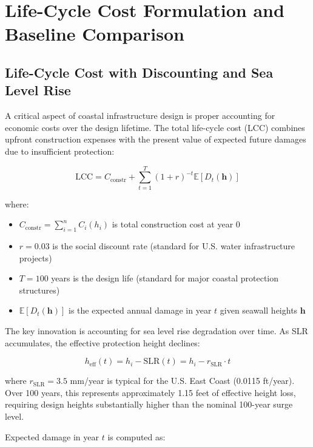 \documentclass[review]{elsarticle}
\begin{document}
\section{Life-Cycle Cost Formulation and Baseline Comparison}

\subsection{Life-Cycle Cost with Discounting and Sea Level Rise}

A critical aspect of coastal infrastructure design is proper accounting for economic costs over the design lifetime. The total life-cycle cost (LCC) combines upfront construction expenses with the present value of expected future damages due to insufficient protection:

\begin{equation}
\text{LCC} = C_{\text{constr}} + \sum_{t=1}^{T} \left(1 + r\right)^{-t} \mathbb{E}[D_t(\mathbf{h})]
\label{eq:lifecycle_cost}
\end{equation}

where:
\begin{itemize}
\item $C_{\text{constr}} = \sum_{i=1}^{n} C_i(h_i)$ is total construction cost at year 0
\item $r = 0.03$ is the social discount rate (standard for U.S. water infrastructure projects)
\item $T = 100$ years is the design life (standard for major coastal protection structures)
\item $\mathbb{E}[D_t(\mathbf{h})]$ is the expected annual damage in year $t$ given seawall heights $\mathbf{h}$
\end{itemize}

The key innovation is accounting for sea level rise degradation over time. As SLR accumulates, the effective protection height declines:

\begin{equation}
h_{\text{eff}}(t) = h_i - \text{SLR}(t) = h_i - r_{\text{SLR}} \cdot t
\label{eq:slr_degradation}
\end{equation}

where $r_{\text{SLR}} = 3.5$ mm/year is typical for the U.S. East Coast (0.0115 ft/year). Over 100 years, this represents approximately 1.15 feet of effective height loss, requiring design heights substantially higher than the nominal 100-year surge level.

Expected damage in year $t$ is computed as:
\end{document}
